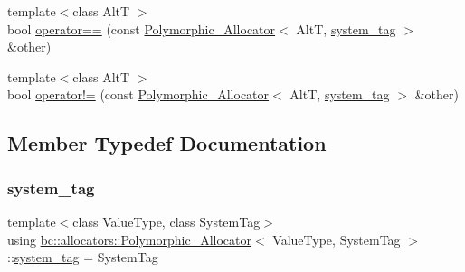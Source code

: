 \begin{DoxyCompactItemize}
\item 
{\footnotesize template$<$class AltT $>$ }\\bool \hyperlink{structbc_1_1allocators_1_1Polymorphic__Allocator_a2162c3db4209225f13a046270efa3086}{operator==} (const \hyperlink{structbc_1_1allocators_1_1Polymorphic__Allocator}{Polymorphic\+\_\+\+Allocator}$<$ AltT, \hyperlink{structbc_1_1allocators_1_1Polymorphic__Allocator_a8036f2439226926f10176abbe9ef6f9d}{system\+\_\+tag} $>$ \&other)
\item 
{\footnotesize template$<$class AltT $>$ }\\bool \hyperlink{structbc_1_1allocators_1_1Polymorphic__Allocator_aa1a0c441f9204498a7bae488884488a4}{operator!=} (const \hyperlink{structbc_1_1allocators_1_1Polymorphic__Allocator}{Polymorphic\+\_\+\+Allocator}$<$ AltT, \hyperlink{structbc_1_1allocators_1_1Polymorphic__Allocator_a8036f2439226926f10176abbe9ef6f9d}{system\+\_\+tag} $>$ \&other)
\end{DoxyCompactItemize}


\subsection{Member Typedef Documentation}
\mbox{\label{structbc_1_1allocators_1_1Polymorphic__Allocator_a8036f2439226926f10176abbe9ef6f9d}} 
\subsubsection{\texorpdfstring{system\+\_\+tag}{system\_tag}}
{\footnotesize\ttfamily template$<$class Value\+Type, class System\+Tag$>$ \\
using \hyperlink{structbc_1_1allocators_1_1Polymorphic__Allocator}{bc\+::allocators\+::\+Polymorphic\+\_\+\+Allocator}$<$ Value\+Type, System\+Tag $>$\+::\hyperlink{structbc_1_1allocators_1_1Polymorphic__Allocator_a8036f2439226926f10176abbe9ef6f9d}{system\+\_\+tag} =  System\+Tag}

\mbox{\label{structbc_1_1allocators_1_1Polymorphic__Allocator_a2655c4bc3c86364c42aa20639a1b7a44}} 
